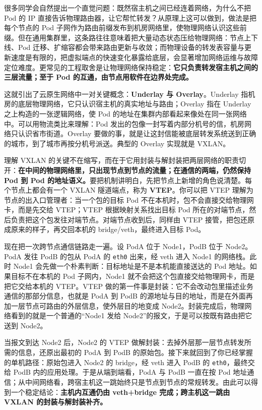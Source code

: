 很多同学会自然提出一个直觉问题：既然宿主机之间已经连着网络，为什么不把 Pod 的 IP 直接告诉物理路由器，让它帮忙转发？从原理上这可以做到，做法是把每个节点的 Pod 子网作为路由前缀发布到机房网络里，使物理网络认识这些前缀。但在通用集群里，这条路往往意味着把大量动态状态压给物理网络：节点上下线、Pod 迁移、扩缩容都会带来路由更新与收敛；而物理设备的转发表容量与更新速度是有限的，把虚拟端点的快速变化暴露给底层，会显著增加网络运维与故障定位难度。更常见的工程取舍是让物理网络保持稳定：\textbf{它只负责转发宿主机之间的三层流量；至于 Pod 的互通，由节点用软件在边界处完成。}

这就引出了云原生网络中一对关键概念：\textbf{Underlay 与 Overlay}。Underlay 指机房的底层物理网络，它只认识宿主机的真实地址与路由；Overlay 指在 Underlay 之上构造的一张逻辑网络，使 Pod 的地址在集群内部看起来像处在同一张网络中。可以用物流类比来理解：Pod 发出的包像一封写着内部分机号的信，机房网络只认识省市街道。Overlay 要做的事，就是让这封信能被底层转发系统送到正确的城市，到了城市再按分机号派送。典型的 Overlay 实现就是 VXLAN。

理解 VXLAN 的关键不在缩写，而在于它用封装与解封装把两层网络的职责切开：\textbf{在中间的物理网络里，只出现节点到节点的流量；在通信的两端，仍然保持 Pod 到 Pod 的地址语义。}要把机制讲明白，先把节点上新增的角色说清楚。每个节点上都会有一个 VXLAN 隧道端点，称为 \textbf{VTEP}。你可以把 VTEP 理解为节点的出入口管理者：当一个包的目标 Pod 不在本机时，包不会直接交给物理网卡，而是先交给 VTEP；VTEP 根据映射关系找出目标 Pod 所在的对端节点，然后负责把这个包发往对端节点。对端节点收到后，同样由 VTEP 接管，把包还原成原来的样子，再交回本机的 bridge/veth，最终进入目标 Pod。

现在把一次跨节点通信链路走一遍。设 PodA 位于 Node1，PodB 位于 Node2。PodA 发往 PodB 的包从 PodA 的 \texttt{eth0} 出来，经 veth 进入 Node1 的网络栈。此时 Node1 会先做一个朴素判断：目标地址是不是本机能直接送达的 Pod 地址。如果目标不在本机的 Pod 子网内，Node1 就不会把这个包直接交给物理网卡，而是把它交给本机的 VTEP。VTEP 做的第一件事是封装：它不会改动包里描述业务通信的那部分信息，也就是 PodA 到 PodB 的源地址与目的地址，而是在外面再加一层节点可路由的外层信息，使外层目的地变成 Node2。封装完成后，物理网络看到的就是一个普通的“Node1 发给 Node2”的报文，于是可以按既有路由把它送到 Node2。

当报文到达 Node2 后，Node2 的 VTEP 做解封装：去掉外层那一层节点转发所需的信息，还原出最初的 PodA 到 PodB 的原始包。接下来就回到了你已经掌握的单机路径：原始包进入 Node2 的 bridge，经 veth 进入 PodB 的 \texttt{eth0}，最终交给 PodB 内的应用处理。于是从端到端看，PodA 与 PodB 一直在按 Pod 地址通信；从中间网络看，跨宿主机这一跳始终只是节点到节点的常规转发。由此可以得到一个稳定结论：\textbf{主机内互通仍由 veth+bridge 完成；跨主机这一跳由 VXLAN 的封装与解封装补齐。}

